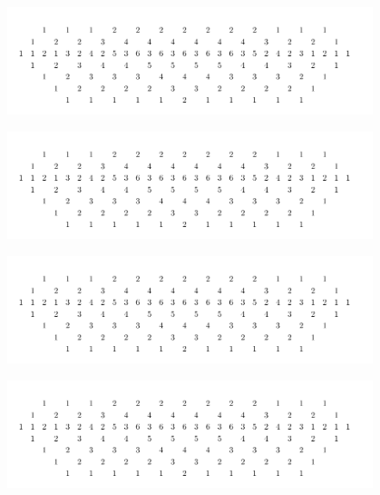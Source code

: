 \documentclass[a4paper]{article}
\begin{document}
\vspace*{1cm} %

\begin{center}
    \includegraphics[width=0.8\textwidth]{h_E8.pdf} %
\end{center}

\vspace{1cm} %

\begin{center}
    \includegraphics[width=0.8\textwidth]{h_E8.pdf} %
\end{center}

\vspace{1cm} %

\begin{center}
    \includegraphics[width=0.8\textwidth]{h_E8.pdf} %
\end{center}

\vspace{1cm} %

\begin{center}
    \includegraphics[width=0.8\textwidth]{h_E8.pdf} %
\end{center}
\end{document}
